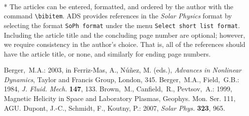 \documentclass[namedreferences]{SolarPhysics}
\newcommand{\solphys}{{\it Solar Phys.}}
\begin{document}
\begin{article}
\\*
  The articles can be entered, formatted, and ordered  
by the author with the command \verb+\bibitem+.  ADS provides
references in the {\it Solar Physics} format by selecting
the format \verb+SoPh format+ under the menu 
\verb+Select short list format+.    Including the article title
and the concluding page number are optional;
however, we require consistency in the author's choice.
That is, all of the references should have the article title, or none,
and similarly for ending page numbers.

\begin{thebibliography}{}
Berger,~M.A.: 
2003, in Ferriz-Mas, A., N{\'u}{\~n}ez, M. (eds.),
    \textit{Advances in Nonlinear Dynamics}, Taylor and Francis Group, 
    London, 345.
Berger,~M.A., Field,~G.B.: 
1984, \textit{J. Fluid. Mech.} \textbf{147}, 133.
Brown,~M., Canfield,~R., Pevtsov,~A.:
1999, Magnetic Helicity in Space and Laboratory Plasmas, Geophys. Mon. 
      Ser. 111, AGU.
Dupont, J.-C., Schmidt, F., Koutny, P.: 2007, \solphys{} \textbf{323}, 965. 
\end{thebibliography}

\end{article} 
\end{document}
